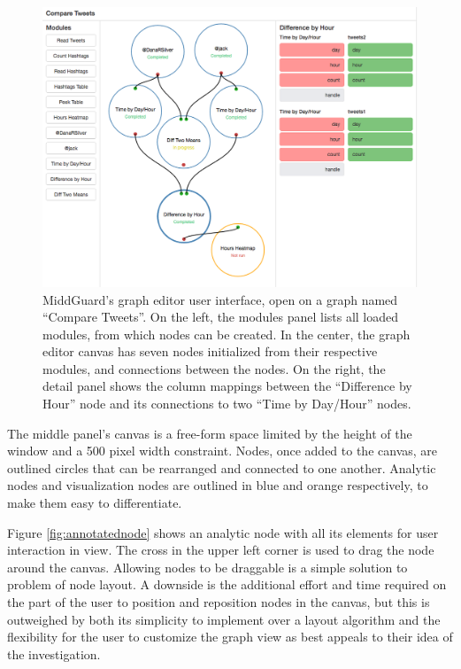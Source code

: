 \documentclass[midd]{thesis}
\begin{document}
\begin{figure}[!ht]
  \centering
  \includegraphics[width=1\textwidth]{compare-tweets-graph-editor-no-sidebar}
  \caption{MiddGuard's graph editor user interface, open on a graph named
  ``Compare Tweets''. On the left, the modules panel lists all loaded modules,
  from which nodes can be created. In the center, the graph editor canvas has
  seven nodes initialized from their respective modules, and connections between
  the nodes. On the right, the detail panel shows the column mappings between
  the ``Difference by Hour'' node and its connections to two
  ``Time by Day/Hour'' nodes.}
  \label{fig:grapheditor}
\end{figure}

The middle panel's canvas is a free-form space limited by the height of the
window and a 500 pixel width constraint. Nodes, once added to the canvas, are
outlined circles that can be rearranged and connected to one another. Analytic
nodes and visualization nodes are outlined in blue and orange respectively, to
make them easy to differentiate.

Figure \ref{fig:annotatednode} shows an analytic node with all its elements for
user interaction in view. The cross in the upper left corner is used to drag the
node around the canvas. Allowing nodes to be draggable is a simple solution to
problem of node layout. A downside is the additional effort and time required on
the part of the user to position and reposition nodes in the canvas, but this is
outweighed by both its simplicity to implement over a layout algorithm and the
flexibility for the user to customize the graph view as best appeals to their
idea of the investigation.
\end{document}
